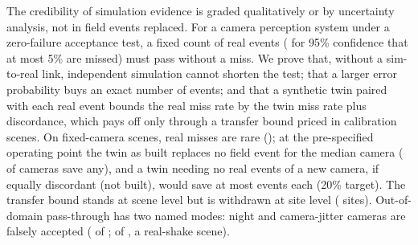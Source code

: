 The credibility of simulation evidence is graded qualitatively or by uncertainty analysis, not in field events
replaced. For a camera perception system under a zero-failure acceptance test, a fixed count
of real events (\nNzero{} for 95\% confidence that at most 5\% are missed) must pass without a miss. We prove that,
without a sim-to-real link, independent simulation cannot shorten the test; that a larger
error probability buys an exact number of events; and that a synthetic twin paired with each real event
bounds the real miss rate by the twin miss rate plus discordance, which pays off only through a transfer bound
priced in calibration scenes. On \nMainScenes{} fixed-camera scenes, real misses are rare (\nPmainOPshort); at the
pre-specified operating point the twin as built replaces no field event for the median camera (\nTcamfinOPS{} of
\nMainScenes{} cameras save any), and a twin needing no real events of a new camera, if equally discordant (not built),
would save at most \nSavedOP{} events each (20\% target). The transfer bound stands at scene level but is withdrawn at site
level (\nSiteSm{} sites). Out-of-domain pass-through has two named modes: night and camera-jitter cameras are falsely
accepted (\nOODSNightfa{} of \nOODSNightcams{}; \nOODSJitfa{} of \nOODSJitcams{}, a real-shake scene).

